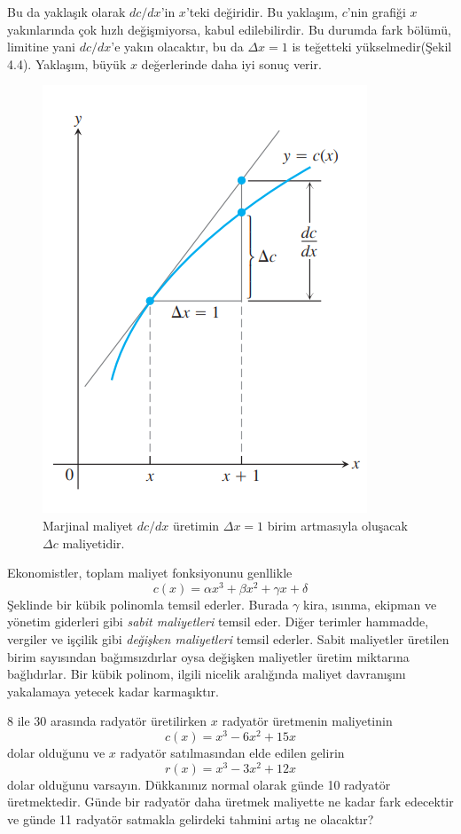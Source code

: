 Bu da yaklaşık olarak $dc/dx$'in $x$'teki değiridir. Bu yaklaşım, $c$'nin grafiği $x$ yakınlarında çok hızlı değişmiyorsa, kabul edilebilirdir. Bu durumda fark bölümü, limitine yani $dc/dx$'e yakın olacaktır, bu da $\varDelta x=1$ is teğetteki yükselmedir(Şekil 4.4). Yaklaşım, büyük $x$ değerlerinde daha iyi sonuç verir.
\begin{figure}[H]
	\centering
	\includegraphics[width=0.5\linewidth]{ekonomideturev2.png}
	\caption{Marjinal maliyet $dc/dx$ üretimin $\varDelta x=1$ birim artmasıyla oluşacak $\varDelta c$ maliyetidir.}
	\label{fig:ornekresim}
\end{figure}
Ekonomistler, toplam maliyet fonksiyonunu genllikle
	\begin{equation*}
	c(x)=\alpha x^3+ \beta x^2 +\gamma x + \delta
	\end{equation*}
Şeklinde bir kübik polinomla temsil ederler. Burada $\gamma$ kira, ısınma, ekipman ve yönetim giderleri gibi \textit{sabit maliyetleri} temsil eder. Diğer terimler hammadde, vergiler ve işçilik gibi \textit{değişken maliyetleri} temsil ederler. Sabit maliyetler üretilen birim sayısından bağımsızdırlar oysa değişken maliyetler üretim miktarına bağlıdırlar. Bir kübik polinom, ilgili nicelik aralığında maliyet davranışını yakalamaya yetecek kadar karmaşıktır.
\begin{ornek}
	8 ile 30 arasında radyatör üretilirken $x$ radyatör üretmenin maliyetinin
	\begin{equation*}
	c(x)=x^3-6x^2+15x
	\end{equation*}
dolar olduğunu ve $x$ radyatör satılmasından elde edilen gelirin
	\begin{equation*}
	r(x)=x^3-3x^2+12x
	\end{equation*}
dolar olduğunu varsayın. Dükkanınız normal olarak günde 10 radyatör üretmektedir. Günde bir radyatör daha üretmek maliyette ne kadar fark edecektir ve günde 11 radyatör satmakla gelirdeki tahmini artış ne olacaktır?
\end{ornek}
